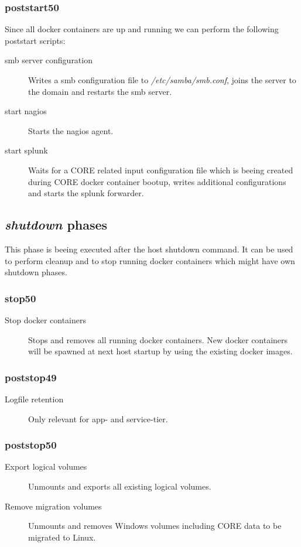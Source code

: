 			\subsubsection{poststart50}
			Since all docker containers are up and running we can perform the following poststart scripts:
			\begin{description}
				\item[smb server configuration] Writes a smb configuration file to \emph{/etc/samba/smb.conf}, joins the server to the domain and restarts the smb server.
				\item[start nagios] Starts the nagios agent.
				\item[start splunk] Waits for a CORE related input configuration file which is beeing created during CORE docker container bootup, writes additional configurations and starts the splunk forwarder.
			\end{description}
		\subsection{\emph{shutdown} phases}
		This phase is beeing executed after the host shutdown command. It can be used to perform cleanup and to stop running docker containers which might have own shutdown phases.
			\subsubsection{stop50}
			\begin{description}
				\item[Stop docker containers] Stops and removes all running docker containers. New docker containers will be spawned at next host startup by using the existing docker images.
			\end{description}
			\subsubsection{poststop49}
			\begin{description}
				\item[Logfile retention] Only relevant for app- and service-tier.
			\end{description}
			\subsubsection{poststop50}
			\begin{description}
				\item[Export logical volumes] Unmounts and exports all existing logical volumes.
				\item[Remove migration volumes] Unmounts and removes Windows volumes including CORE data to be migrated to Linux.
			\end{description}

